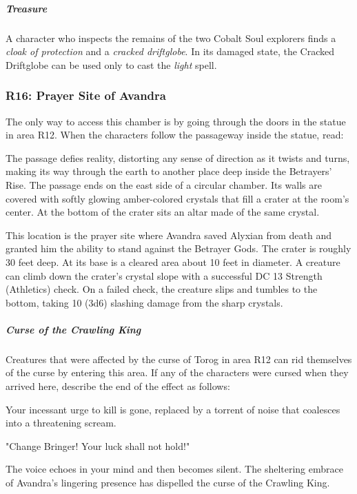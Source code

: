 \documentclass[10pt,a4paper,twoside,fancy,bg=print,twocolumn,openany,nodeprecatedcode]{dndbook}
\begin{document}
\subparagraph{Treasure}
A character who inspects the remains of the two Cobalt Soul explorers finds a \textit{cloak of protection} and a \textit{cracked driftglobe}. In its damaged state, the Cracked Driftglobe can be used only to cast the \textit{light} spell.

\subsubsection{R16: Prayer Site of Avandra}
The only way to access this chamber is by going through the doors in the statue in area R12. When the characters follow the passageway inside the statue, read:

\begin{DndReadAloud}{}
The passage defies reality, distorting any sense of direction as it twists and turns, making its way through the earth to another place deep inside the Betrayers' Rise. The passage ends on the east side of a circular chamber. Its walls are covered with softly glowing amber-colored crystals that fill a crater at the room's center. At the bottom of the crater sits an altar made of the same crystal.

\end{DndReadAloud}

This location is the prayer site where Avandra saved Alyxian from death and granted him the ability to stand against the Betrayer Gods. The crater is roughly 30 feet deep. At its base is a cleared area about 10 feet in diameter. A creature can climb down the crater's crystal slope with a successful DC 13 Strength (Athletics) check. On a failed check, the creature slips and tumbles to the bottom, taking 10 (3d6) slashing damage from the sharp crystals.

\subparagraph{Curse of the Crawling King}
Creatures that were affected by the curse of Torog in area R12 can rid themselves of the curse by entering this area. If any of the characters were cursed when they arrived here, describe the end of the effect as follows:

\begin{DndReadAloud}{}
Your incessant urge to kill is gone, replaced by a torrent of noise that coalesces into a threatening scream.

"Change Bringer! Your luck shall not hold!"

The voice echoes in your mind and then becomes silent. The sheltering embrace of Avandra's lingering presence has dispelled the curse of the Crawling King.

\end{DndReadAloud}
\end{document}
